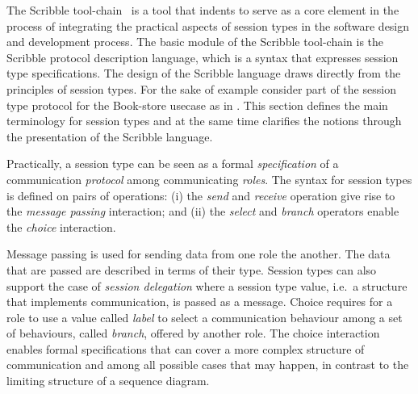 The Scribble tool-chain~\cite{scribble} is a tool that indents
to serve as a core element in the process of integrating
the practical aspects of session types in the software
design and development process. The basic module of the Scribble
tool-chain is the Scribble protocol description language,
which is a syntax that expresses session type specifications.
The design of the Scribble language draws directly from
the principles of session types. For the sake of example
consider part of the session type protocol for the Book-store
usecase as in . 
This section defines
the main terminology for session types and at the same
time clarifies the notions through the presentation
of the Scribble language.

Practically, a session type can be seen as a formal
{\em specification} of a communication {\em protocol} among communicating {\em roles}.
The syntax for session types is defined on pairs of operations:
(i) the {\em send} and {\em receive} operation give rise to
the {\em message passing} interaction; and
(ii) the {\em select} and {\em branch} operators enable the
{\em choice} interaction.

Message passing is used for sending data from one role the another.
The data that are passed are described in terms of their type. Session
types can also support the case of {\em session delegation}
where a session type value, i.e.~a structure that implements communication,
is passed as a message.
Choice requires for a role to use a value called {\em label}
to select a communication behaviour among
a set of behaviours, called {\em branch}, offered by another role.
The choice interaction enables formal specifications that can
cover a more complex structure of communication and among all possible
cases that may happen, in contrast to the limiting structure of
a sequence diagram.

